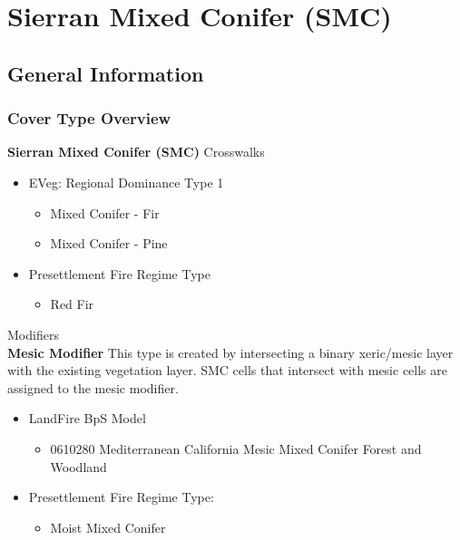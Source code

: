 \newpage
\section{Sierran Mixed Conifer (SMC)}

\subsection*{General Information}

\subsubsection{Cover Type Overview}

\textbf{Sierran Mixed Conifer (SMC)}
\newline
Crosswalks
\begin{itemize}
	\item EVeg: Regional Dominance Type 1
	\begin{itemize}
		\item Mixed Conifer - Fir
		\item Mixed Conifer - Pine
	\end{itemize}

	\item Presettlement Fire Regime Type
	\begin{itemize}
		\item Red Fir
	\end{itemize}
\end{itemize}


\noindent Modifiers \\
\medskip
\noindent \textbf{Mesic Modifier } This type is created by intersecting a binary xeric/mesic layer with the existing vegetation layer. SMC cells that intersect with mesic cells are assigned to the mesic modifier.
\begin{itemize}
	\item LandFire BpS Model
	\begin{itemize}
		\item 0610280 Mediterranean California Mesic Mixed Conifer Forest and Woodland
	\end{itemize}
		\item Presettlement Fire Regime Type: 
	\begin{itemize}
		\item Moist Mixed Conifer
	\end{itemize}
\end{itemize}

